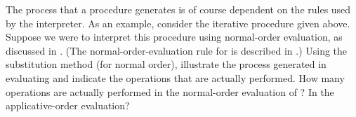 \begin{exerciseGroup}
\label{Exercise 1.20}
 The process that a procedure
generates is of course dependent on the rules used by the interpreter.  As an
example, consider the iterative  procedure given above.  Suppose we
were to interpret this procedure using normal-order evaluation, as discussed in
.  (The normal-order-evaluation rule for  is
described in .)  Using the substitution method (for normal
order), illustrate the process generated in evaluating  and
indicate the \code{\%} operations that are actually performed.  How many
\code{\%} operations are actually performed in the normal-order evaluation of
?  In the applicative-order evaluation?
\end{exerciseGroup}

